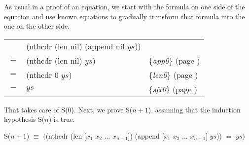 As usual in a proof of an equation,
we start with the formula on one side of the equation
and use known equations to gradually transform that formula
into the one on the other side.

\begin{center}
\begin{tabular}{lll}
    & \textsf{(nthcdr (len nil) (append nil $ys$))}  &                                                  \\
$=$ & \textsf{(nthcdr (len nil) $ys$)}               & \{\emph{app0}\} (page \pageref{fig:append-defun})\\
$=$ & \textsf{(nthcdr 0 $ys$)}                       & \{\emph{len0}\} (page \pageref{len-equations})   \\
$=$ & $ys$                                  & \{\emph{sfx0}\} (page \pageref{fig:nthcdr-defun})\\
\end{tabular}
\end{center}

That takes care of S(0). Next, we prove S($n+1$), assuming that
the induction hypothesis S($n$) is true.

\begin{samepage}
\begin{center}
S($n+1$) $\equiv$ $($\textsf{(nthcdr (len [$x_1$ $x_2$ $\dots$ $x_{n+1}$]) (append [$x_1$ $x_2$ $\dots$ $x_{n+1}$] $ys$))} $=$ $ys)$
\end{center}
\end{samepage}

